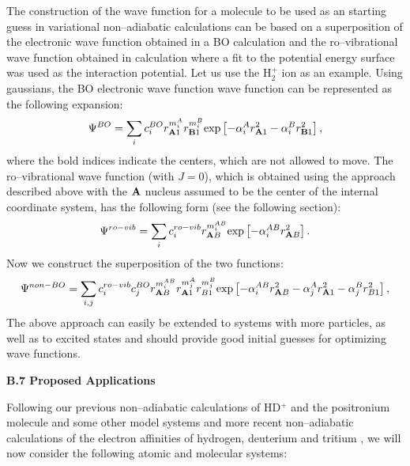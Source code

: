{{The construction of the wave function for a molecule 
to be used as an
starting guess in variational non--adiabatic calculations
can be based on a superposition of the electronic wave function
obtained in a BO calculation and the ro--vibrational wave function
obtained in calculation where a fit to the potential energy
surface was used as the interaction potential. Let us use the H$_2^+$
ion as an example. Using gaussians, the BO electronic wave function 
wave function can be represented as the following expansion:
\begin{equation}
\Psi^{BO} = 
\sum_i c_i^{BO} r_{ {\bf A}1}^{m_i^A} r_{ {\bf B}1}^{m_i^B}
{\rm exp} \left[ -\alpha_i^A r_{ {\bf A}1}^2 
- \alpha_i^B r_{ {\bf B}1}^2 \right],
\label{BO1}
\end{equation}
where the bold indices indicate the centers, which are not allowed to move.
The ro--vibrational wave function (with $J=0$), which is obtained using the
approach described above with the ${\bf A}$ nucleus assumed to be
the center of the internal coordinate system, has the following form
(see the following section):
\begin{equation}
\Psi^{ro-vib} = 
\sum_i c_i^{ro-vib} r_{ {\bf A}B}^{m_i^{AB}} 
{\rm exp} \left[ -\alpha_i^{AB} r_{ {\bf A}B}^2 \right].
\label{BO2}
\end{equation}
Now we construct the superposition of the two functions:
\begin{equation}
\Psi^{non-BO} = 
\sum_{i,j} c_i^{ro-vib} c_j^{BO} 
r_{ {\bf A}B}^{m_i^{AB}}
r_{ {\bf A}1}^{m_j^A} r_{B1}^{m_j^B}
{\rm exp} 
\left[ -\alpha_i^{AB} r_{ {\bf A}B}^2 -\alpha_j^A r_{ {\bf A}1}^2 
- \alpha_j^B r_{B1}^2 \right],
\label{BO3}
\end{equation}
The above approach can easily be extended to systems with more particles,
as well as to excited states
and should provide good initial guesses for optimizing wave functions.



\vspace{2mm}
\noindent
{\bf B.7 Proposed Applications}


Following our previous non--adiabatic calculations of HD$^+$
and the positronium molecule and some other model systems
\cite{A3,A6,A16,A27,kozlowski91,%
kozlowski92b,kozlowski92c} and more 
recent non--adiabatic calculations
of the electron affinities of hydrogen, deuterium and tritium
\cite{A37},
we will now consider the following atomic and molecular systems:



}}
